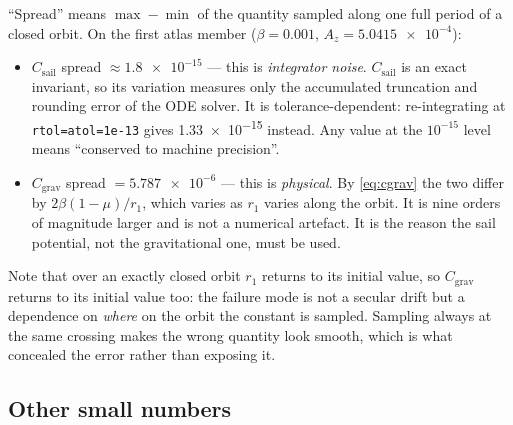 \documentclass[11pt,a4paper]{article}
\begin{document}
``Spread'' means $\max-\min$ of the quantity sampled along one full period of a
closed orbit. On the first atlas member ($\beta=0.001$, $A_z=\num{5.0415e-4}$):
\begin{itemize}
\item $C_{\mathrm{sail}}$ spread $\approx\num{1.8e-15}$ --- this is
      \emph{integrator noise}. $C_{\mathrm{sail}}$ is an exact invariant, so its
      variation measures only the accumulated truncation and rounding error of
      the ODE solver. It is tolerance-dependent: re-integrating at
      \texttt{rtol=atol=1e-13} gives \num{1.33e-15} instead. Any value at the
      $10^{-15}$ level means ``conserved to machine precision''.
\item $C_{\mathrm{grav}}$ spread $=\num{5.787e-6}$ --- this is \emph{physical}.
      By \eqref{eq:cgrav} the two differ by $2\beta(1-\mu)/r_1$, which varies as
      $r_1$ varies along the orbit. It is nine orders of magnitude larger and is
      not a numerical artefact. It is the reason the sail potential, not the
      gravitational one, must be used.
\end{itemize}
Note that over an exactly closed orbit $r_1$ returns to its initial value, so
$C_{\mathrm{grav}}$ returns to its initial value too: the failure mode is not a
secular drift but a dependence on \emph{where} on the orbit the constant is
sampled. Sampling always at the same crossing makes the wrong quantity look
smooth, which is what concealed the error rather than exposing it.

\subsection{Other small numbers}
\end{document}
